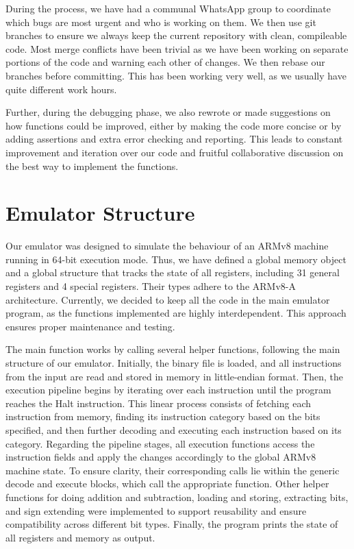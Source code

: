 \documentclass[11pt]{article}
\begin{document}
During the process, we have had a communal WhatsApp group to coordinate which bugs are most urgent and who is working on them. We then use git branches to ensure we always keep the current repository with clean, compileable code. Most merge conflicts have been trivial as we have been working on separate portions of the code and warning each other of changes. We then rebase our branches before committing. This has been working very well, as we usually have quite different work hours.

Further, during the debugging phase, we also rewrote or made suggestions on how functions could be improved, either by making the code more concise or by adding assertions and extra error checking and reporting. This leads to constant improvement and iteration over our code and fruitful collaborative discussion on the best way to implement the functions.

\section{Emulator Structure}

Our emulator was designed to simulate the behaviour of an ARMv8 machine running in 64-bit execution mode. Thus, we have defined a global memory object and a global structure that tracks the state of all registers, including 31 general registers and 4 special registers. Their types adhere to the ARMv8-A architecture. Currently, we decided to keep all the code in the main emulator program, as the functions implemented are highly interdependent. This approach ensures proper maintenance and testing.

The main function works by calling several helper functions, following the main structure of our emulator. Initially, the binary file is loaded, and all instructions from the input are read and stored in memory in little-endian format. Then, the execution pipeline begins by iterating over each instruction until the program reaches the Halt instruction. This linear process consists of fetching each instruction from memory, finding its instruction category based on the bits specified, and then further decoding and executing each instruction based on its category. Regarding the pipeline stages, all execution functions access the instruction fields and apply the changes accordingly to the global ARMv8 machine state. To ensure clarity, their corresponding calls lie within the generic decode and execute blocks, which call the appropriate function. Other helper functions for doing addition and subtraction, loading and storing, extracting bits, and sign extending were implemented to support reusability and ensure compatibility across different bit types. Finally, the program prints the state of all registers and memory as output.
\end{document}

